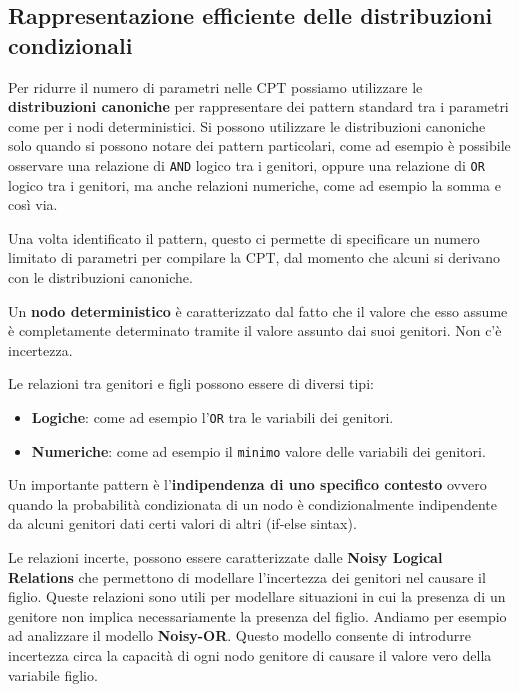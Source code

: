 \subsection{Rappresentazione efficiente delle distribuzioni condizionali}
Per ridurre il numero di parametri nelle CPT possiamo utilizzare le \textbf{distribuzioni
    canoniche} per rappresentare dei pattern standard tra i parametri come per
i nodi deterministici. Si possono utilizzare le distribuzioni canoniche solo
quando si possono notare dei pattern particolari, come ad esempio è possibile
osservare una relazione di \texttt{AND} logico tra i genitori, oppure una relazione
di \texttt{OR} logico tra i genitori, ma anche relazioni numeriche, come ad esempio
la somma e così via.

Una volta identificato il pattern, questo ci permette di specificare un numero
limitato di parametri per compilare la CPT, dal momento che alcuni si derivano
con le distribuzioni canoniche.
\begin{definizione}
    Un \textbf{nodo deterministico} è caratterizzato dal fatto che il valore che
    esso assume è completamente determinato tramite il valore assunto dai suoi
    genitori. Non c'è incertezza.
\end{definizione}
Le relazioni tra genitori e figli possono essere di diversi tipi:
\begin{itemize}
    \item \textbf{Logiche}: come ad esempio l'\texttt{OR} tra le variabili dei
          genitori.
    \item \textbf{Numeriche}: come ad esempio il \texttt{minimo} valore delle
          variabili dei genitori.
\end{itemize}
Un importante pattern è l'\textbf{indipendenza di uno specifico contesto} ovvero
quando la probabilità condizionata di un nodo è condizionalmente indipendente
da alcuni genitori dati certi valori di altri (if-else sintax).

Le relazioni incerte, possono essere caratterizzate dalle \textbf{Noisy Logical
    Relations} che permettono di modellare l'incertezza dei genitori nel causare
il figlio. Queste relazioni sono utili per modellare situazioni in cui la presenza
di un genitore non implica necessariamente la presenza del figlio.
Andiamo per esempio ad analizzare il modello \textbf{Noisy-OR}. Questo modello
consente di introdurre incertezza circa la capacità di ogni nodo genitore di
causare il valore vero della variabile figlio.

